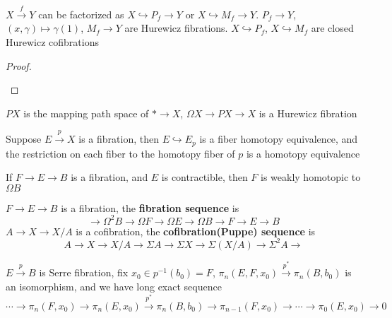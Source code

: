 \documentclass[main]{subfiles}
\begin{document}
\begin{proposition}
$X\xrightarrow f Y$ can be factorized as $X\hookrightarrow P_f\to Y$ or $X\hookrightarrow M_f\to Y$. $P_f\to Y$, $(x,\gamma)\mapsto\gamma(1)$, $M_f\to Y$ are Hurewicz fibrations. $X\hookrightarrow P_f$, $X\hookrightarrow M_f$ are closed Hurewicz cofibrations
\end{proposition}

\begin{proof}
\begin{center}
\end{center}
\end{proof}

\begin{example}
$PX$ is the mapping path space of $*\to X$, $\Omega X\to PX\to X$ is a Hurewicz fibration
\end{example}

\begin{proposition}
Suppose $E\xrightarrow{p}X$ is a fibration, then $E\hookrightarrow E_p$ is a fiber homotopy equivalence, and the restriction on each fiber to the homotopy fiber of $p$ is a homotopy equivalence
\end{proposition}

\begin{proposition}
If $F\to E\to B$ is a fibration, and $E$ is contractible, then $F$ is weakly homotopic to $\Omega B$
\end{proposition}

\begin{theorem}
$F\to E\to B$ is a fibration, the \textbf{fibration sequence} is
\[\to\Omega^2B\to\Omega F\to\Omega E\to\Omega B\to F\to E\to B\]
$A\to X\to X/A$ is a cofibration, the \textbf{cofibration(Puppe) sequence} is
\[A\to X\to X/A\to\Sigma A\to\Sigma X\to\Sigma(X/A)\to\Sigma^2 A\to\]
\end{theorem}

\begin{theorem}
$E\xrightarrow{p} B$ is Serre fibration, fix $x_0\in p^{-1}(b_0)=F$, $\pi_n(E,F,x_0)\xrightarrow{p^*}\pi_n(B,b_0)$ is an isomorphism, and we have long exact sequence
\[\cdots\to\pi_n(F,x_0)\to\pi_n(E,x_0)\xrightarrow{p^*}\pi_n(B,b_0)\to\pi_{n-1}(F,x_0)\to\cdots\to\pi_0(E,x_0)\to0\]
\end{theorem}
\end{document}
